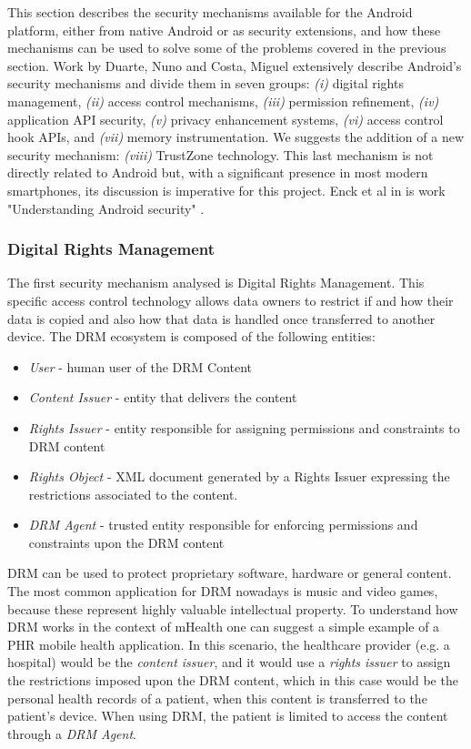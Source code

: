 This section describes the security mechanisms available for the Android platform, either from native Android or as security extensions, and how these mechanisms can be used to solve some of the problems covered in the previous section. Work by Duarte, Nuno \cite{nunoduarte} and Costa, Miguel \cite{miguelcosta} extensively describe Android's security mechanisms and divide them in seven groups: \emph{(i)} digital rights management, \emph{(ii)} access control mechanisms, \emph{(iii)} permission refinement, \emph{(iv)} application API security, \emph{(v)} privacy enhancement systems, \emph{(vi)} access control hook APIs, and \emph{(vii)} memory instrumentation. We suggests the addition of a new security mechanism: \emph{(viii)} TrustZone technology. This last mechanism is not directly related to Android but, with a significant presence in most modern smartphones, its discussion is imperative for this project. Enck et al in is work "Understanding Android security" \cite{enck2009understanding}.%

\subsubsection{Digital Rights Management}
The first security mechanism analysed is Digital Rights Management. This specific access control technology allows data owners to restrict if and how their data is copied and also how that data is handled once transferred to another device. The \ac{DRM} ecosystem is composed of the following entities:

\begin{itemize}
	\item \emph{User} - human user of the DRM Content
	\item \emph{Content Issuer} - entity that delivers the content
	\item \emph{Rights Issuer} - entity responsible for assigning permissions and constraints to \ac{DRM} content
	\item \emph{Rights Object} - XML document generated by a Rights Issuer expressing the restrictions associated to the content.
	\item \emph{\ac{DRM} Agent} - trusted entity responsible for enforcing permissions and constraints upon the \ac{DRM} content
\end{itemize}

\ac{DRM} can be used to protect proprietary software, hardware or general content. The most common application for \ac{DRM} nowadays is music and video games, because these represent highly valuable intellectual property. To understand how \ac{DRM} works in the context of mHealth one can suggest a simple example of a \ac{PHR} mobile health application. In this scenario, the healthcare provider (e.g. a hospital) would be the \emph{content issuer}, and it would use a \emph{rights issuer} to assign the restrictions imposed upon the \ac{DRM} content, which in this case would be the personal health records of a patient, when this content is transferred to the patient's device. When using \ac{DRM}, the patient is limited to access the content through a \emph{\ac{DRM} Agent}.

